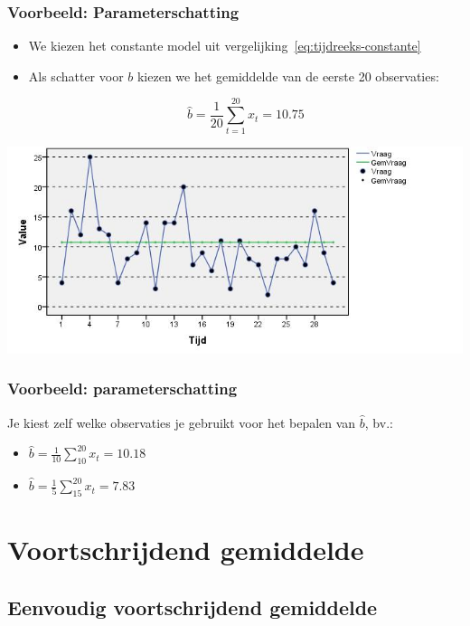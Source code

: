 \documentclass[aspectratio=169]{beamer}
\begin{document}
\begin{frame}
  \frametitle{Voorbeeld: Parameterschatting}

  \begin{itemize}
    \item We kiezen het constante model uit vergelijking~\ref{eq:tijdreeks-constante}
    \item Als schatter voor $b$ kiezen we het gemiddelde van de eerste 20 observaties:

      \[ \widehat{b} = \frac{1}{20} \sum_{t = 1}^{20} x_{t}= 10.75 \]

  \end{itemize}

  \centering
  \includegraphics[width=.7\textwidth]{img/tijdreeks21.jpg}
\end{frame}

\begin{frame}
  \frametitle{Voorbeeld: parameterschatting}

  Je kiest zelf welke observaties je gebruikt voor het bepalen van $\widehat{b}$, bv.:

  \begin{itemize}
    \item $\widehat{b} = \frac{1}{10} \sum_{10}^{20} x_{t} = 10.18$
    \item $\widehat{b} = \frac{1}{5} \sum_{15}^{20} x_{t} = 7.83$
  \end{itemize}

\end{frame}

\section{Voortschrijdend gemiddelde}

\subsection{Eenvoudig voortschrijdend gemiddelde}
\end{document}

